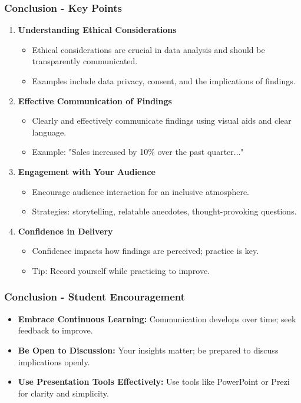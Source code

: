 \documentclass[aspectratio=169]{beamer}
\begin{document}
\begin{frame}[fragile]
    \frametitle{Conclusion - Key Points}
    \begin{enumerate}
        \item \textbf{Understanding Ethical Considerations}
        \begin{itemize}
            \item Ethical considerations are crucial in data analysis and should be transparently communicated.
            \item Examples include data privacy, consent, and the implications of findings.
        \end{itemize}
        
        \item \textbf{Effective Communication of Findings}
        \begin{itemize}
            \item Clearly and effectively communicate findings using visual aids and clear language.
            \item Example: "Sales increased by 10\% over the past quarter..."
        \end{itemize}
        
        \item \textbf{Engagement with Your Audience}
        \begin{itemize}
            \item Encourage audience interaction for an inclusive atmosphere.
            \item Strategies: storytelling, relatable anecdotes, thought-provoking questions.
        \end{itemize}
        
        \item \textbf{Confidence in Delivery}
        \begin{itemize}
            \item Confidence impacts how findings are perceived; practice is key.
            \item Tip: Record yourself while practicing to improve.
        \end{itemize}
    \end{enumerate}
\end{frame}

\begin{frame}[fragile]
    \frametitle{Conclusion - Student Encouragement}
    \begin{itemize}
        \item \textbf{Embrace Continuous Learning:} Communication develops over time; seek feedback to improve.
        
        \item \textbf{Be Open to Discussion:} Your insights matter; be prepared to discuss implications openly.
        
        \item \textbf{Use Presentation Tools Effectively:} Use tools like PowerPoint or Prezi for clarity and simplicity.
    \end{itemize}
\end{frame}
\end{document}
